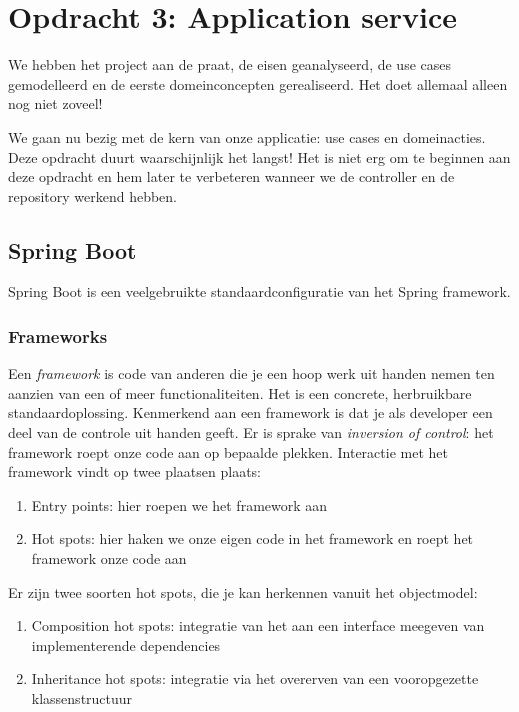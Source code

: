 \documentclass[dutch,a4paper,12pt,doubleside]{book}
\begin{document}
\setcounter{chapter}{2}
\chapter{Opdracht 3: Application service}
We hebben het project aan de praat, de eisen geanalyseerd, 
de use cases gemodelleerd en de eerste domeinconcepten gerealiseerd. 
Het doet allemaal alleen nog niet zoveel!

We gaan nu bezig met de kern van onze applicatie:
use cases en domeinacties. Deze opdracht duurt waarschijnlijk het langst!
Het is niet erg om te beginnen aan deze opdracht en hem later te
verbeteren wanneer we de controller en de repository werkend hebben.

\section{Spring Boot}
Spring Boot is een veelgebruikte standaardconfiguratie van het Spring framework.

\subsection{Frameworks}
Een \textit{framework} is code van anderen die je een hoop werk uit handen 
nemen ten aanzien van een of meer functionaliteiten. Het is een concrete, herbruikbare standaardoplossing.
Kenmerkend aan een framework is dat je als developer een deel van de controle 
uit handen geeft. Er is sprake van \textit{inversion of control}: het framework 
roept onze code aan op bepaalde plekken. Interactie met het framework vindt op twee plaatsen 
plaats:
\begin{enumerate}
    \item Entry points: hier roepen we het framework aan
    \item Hot spots: hier haken we onze eigen code in het framework en roept het framework onze code aan
\end{enumerate}

Er zijn twee soorten hot spots, die je kan herkennen vanuit het objectmodel:
\begin{enumerate}
    \item Composition hot spots: integratie van het aan een interface meegeven 
    van implementerende dependencies
    \item Inheritance hot spots: integratie via het overerven 
    van een vooropgezette klassenstructuur
\end{enumerate}
\end{document}
